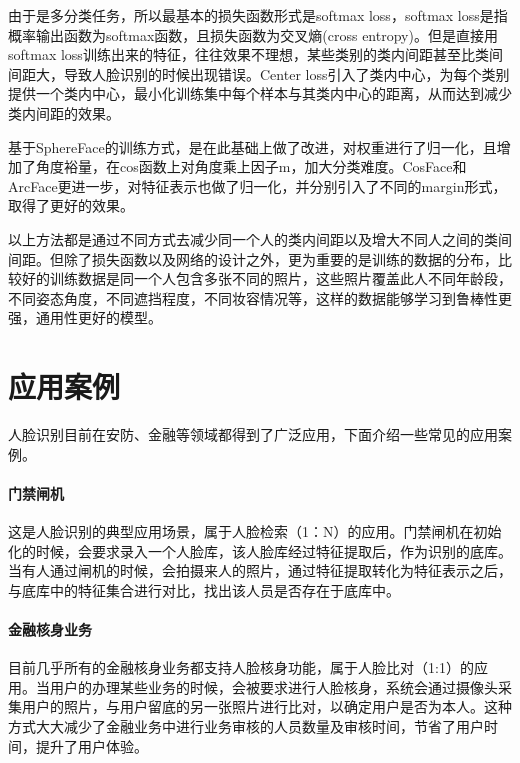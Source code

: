 由于是多分类任务，所以最基本的损失函数形式是softmax loss，softmax loss是指概率输出函数为softmax函数，且损失函数为交叉熵(cross entropy)。但是直接用softmax loss训练出来的特征，往往效果不理想，某些类别的类内间距甚至比类间间距大，导致人脸识别的时候出现错误。Center loss引入了类内中心，为每个类别提供一个类内中心，最小化训练集中每个样本与其类内中心的距离，从而达到减少类内间距的效果。

基于SphereFace的训练方式，是在此基础上做了改进，对权重进行了归一化，且增加了角度裕量，在cos函数上对角度乘上因子m，加大分类难度。CosFace和ArcFace更进一步，对特征表示也做了归一化，并分别引入了不同的margin形式，取得了更好的效果。

以上方法都是通过不同方式去减少同一个人的类内间距以及增大不同人之间的类间间距。但除了损失函数以及网络的设计之外，更为重要的是训练的数据的分布，比较好的训练数据是同一个人包含多张不同的照片，这些照片覆盖此人不同年龄段，不同姿态角度，不同遮挡程度，不同妆容情况等，这样的数据能够学习到鲁棒性更强，通用性更好的模型。
\section{应用案例}

人脸识别目前在安防、金融等领域都得到了广泛应用，下面介绍一些常见的应用案例。
\paragraph{门禁闸机}
这是人脸识别的典型应用场景，属于人脸检索（1：N）的应用。门禁闸机在初始化的时候，会要求录入一个人脸库，该人脸库经过特征提取后，作为识别的底库。当有人通过闸机的时候，会拍摄来人的照片，通过特征提取转化为特征表示之后，与底库中的特征集合进行对比，找出该人员是否存在于底库中。
\paragraph{金融核身业务}
目前几乎所有的金融核身业务都支持人脸核身功能，属于人脸比对（1:1）的应用。当用户的办理某些业务的时候，会被要求进行人脸核身，系统会通过摄像头采集用户的照片，与用户留底的另一张照片进行比对，以确定用户是否为本人。这种方式大大减少了金融业务中进行业务审核的人员数量及审核时间，节省了用户时间，提升了用户体验。
